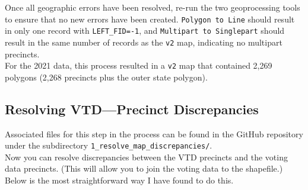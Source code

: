\documentclass[11pt]{article}
\begin{document}
Once all geographic errors have been resolved, re-run the two geoprocessing tools to ensure that no new errors have been created. \verb|Polygon to Line| should result in only one record with \verb|LEFT_FID=-1|, and \verb|Multipart to Singlepart| should result in the same number of records as the \verb|v2| map, indicating no multipart precincts.\\

For the 2021 data, this process resulted in a \verb|v2| map that contained 2,269 polygons (2,268 precincts plus the outer state polygon).

\subsection{Resolving VTD---Precinct Discrepancies}

Associated files for this step in the process can be found in the GitHub repository under the subdirectory \verb|1_resolve_map_discrepancies/|.\\

Now you can resolve discrepancies between the VTD precincts and the voting data precincts. (This will allow you to join the voting data to the shapefile.) Below is the most straightforward way I have found to do this.
\end{document}
